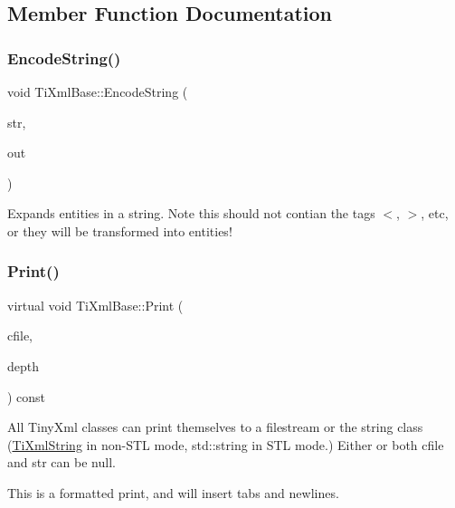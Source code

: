 \subsection{Member Function Documentation}
\hypertarget{class_ti_xml_base_a32ed202562b58de64c7d799ca3c9db98}{}\label{class_ti_xml_base_a32ed202562b58de64c7d799ca3c9db98} 
\subsubsection{\texorpdfstring{Encode\+String()}{EncodeString()}}
{\footnotesize\ttfamily void Ti\+Xml\+Base\+::\+Encode\+String (\begin{DoxyParamCaption}\item[{const T\+I\+X\+M\+L\+\_\+\+S\+T\+R\+I\+NG \&}]{str,  }\item[{T\+I\+X\+M\+L\+\_\+\+S\+T\+R\+I\+NG $\ast$}]{out }\end{DoxyParamCaption})\hspace{0.3cm}{\ttfamily [static]}}

Expands entities in a string. Note this should not contian the tag\textquotesingle{}s \textquotesingle{}$<$\textquotesingle{}, \textquotesingle{}$>$\textquotesingle{}, etc, or they will be transformed into entities! \hypertarget{class_ti_xml_base_a0de56b3f2ef14c65091a3b916437b512}{}\label{class_ti_xml_base_a0de56b3f2ef14c65091a3b916437b512} 
\subsubsection{\texorpdfstring{Print()}{Print()}}
{\footnotesize\ttfamily virtual void Ti\+Xml\+Base\+::\+Print (\begin{DoxyParamCaption}\item[{F\+I\+LE $\ast$}]{cfile,  }\item[{int}]{depth }\end{DoxyParamCaption}) const\hspace{0.3cm}{\ttfamily [pure virtual]}}

All Tiny\+Xml classes can print themselves to a filestream or the string class (\hyperlink{class_ti_xml_string}{Ti\+Xml\+String} in non-\/\+S\+TL mode, std\+::string in S\+TL mode.) Either or both cfile and str can be null.

This is a formatted print, and will insert tabs and newlines.


